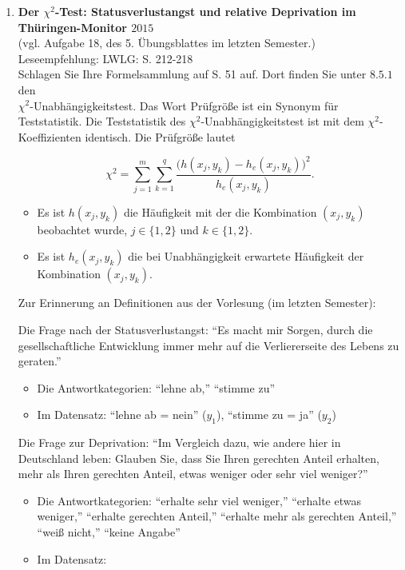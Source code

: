 \documentclass[11pt]{article}
\newcommand{\startwert}{3}
\newcommand{\aufgabe}[1]{\item{\bf #1}}
\begin{document}
\begin{enumerate}\addtocounter{enumi}{\startwert}





\aufgabe{Der $\chi^{2}$-Test:  Statusverlustangst und relative Deprivation im Thüringen-Monitor $2015$}\\
(vgl. Aufgabe 18, des 5. Übungsblattes im letzten Semester.)\\
Leseempfehlung: LWLG: S. 212-218\\

Schlagen Sie Ihre Formelsammlung auf S. 51 auf. Dort finden Sie unter $8.5.1$ den \\
$\chi^{2}$-Unabhängigkeitstest. Das Wort Prüfgröße ist ein Synonym für Teststatistik.
Die Teststatistik des $\chi^{2}$-Unabhängigkeitstest ist mit dem $\chi^{2}$-Koeffizienten
identisch.
Die Prüfgröße lautet

$$
\chi^{2}= \sum_{j=1}^{m} 
\sum_{k=1}^{q} \frac{\big(h(x_{j},y_{k})-h_{e}(x_{j},y_{k})\big)^2}{h_{e}(x_{j},y_{k})}.
$$

\begin{itemize}
\item{Es ist $h(x_{j},y_{k})$ die Häufigkeit mit der die Kombination $(x_{j},y_{k})$
beobachtet wurde, $j \in \{1, 2\}$ und $k \in \{1, 2\}.$}
\item{Es ist $h_{e}(x_{j},y_{k})$ die bei Unabhängigkeit erwartete Häufigkeit 
der  Kombination $(x_{j},y_{k}).$}
\end{itemize}
 	


\vspace{0.5cm}
Zur Erinnerung an Definitionen aus  der Vorlesung (im letzten Semester):

Die Frage nach der Statusverlustangst: ``Es macht mir Sorgen, durch die gesellschaftliche Entwicklung immer mehr auf die Verliererseite
 des Lebens zu geraten.''
 \begin{itemize}
   \item {Die Antwortkategorien: ``lehne ab,'' ``stimme zu''}
    \item {Im Datensatz: ``lehne ab = nein'' ($y_{1}$), ``stimme zu = ja'' ($y_{2}$)}
  \end{itemize} 
  Die Frage zur Deprivation: ``Im Vergleich dazu, wie andere hier in Deutschland leben: 
   Glauben Sie, dass Sie Ihren gerechten Anteil erhalten, 
   mehr als Ihren gerechten Anteil, etwas weniger oder sehr viel weniger?''
   \begin{itemize} 
   \item{Die Antwortkategorien: ``erhalte sehr viel weniger,'' ``erhalte etwas weniger,''  ``erhalte gerechten Anteil,''         
  ``erhalte mehr als gerechten Anteil,''  ``weiß nicht,'' ``keine Angabe''}
  \item{Im Datensatz:
    \begin{description}
    

\end{description}}
\end{itemize}
\end{enumerate}
\end{document}
